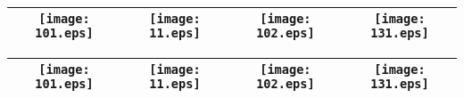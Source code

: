 \begin{table}[ht!]
\begin{tabular}{ccccc}
\toprule
\multicolumn{2}{c}{\texttt{[image: 101.eps]}} & \texttt{[image: 11.eps]} & \texttt{[image: 102.eps]} & \texttt{[image: 131.eps]}\\
\bottomrule
\end{tabular}
\graphicspath{{../../IbexJobs/ibex_lambdas_20191104/Simulations_TEST/Simulation_20180302_\arabic{j}/}}
\begin{tabular}{ccccc}
\toprule
\multicolumn{2}{c}{\texttt{[image: 101.eps]}} & \texttt{[image: 11.eps]} & \texttt{[image: 102.eps]} & \texttt{[image: 131.eps]}\\
\bottomrule
\end{tabular}
\end{table}